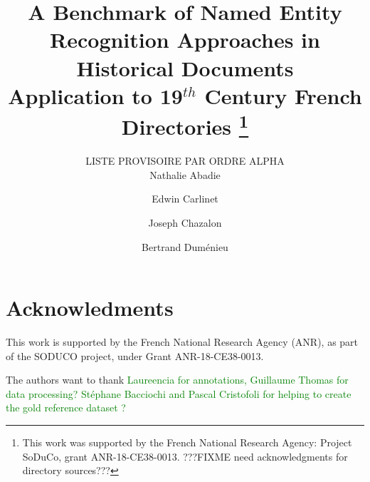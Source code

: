\documentclass[runningheads,svgnames]{llncs}
\begin{document}
%
\title{A Benchmark of Named Entity Recognition Approaches in Historical Documents\\
Application to 19$^{th}$ Century French Directories%
\thanks{This work was supported by the French National Research Agency:
Project SoDuCo, grant ANR-18-CE38-0013. ???FIXME need acknowledgments for directory sources???}}
%
%
\author{LISTE PROVISOIRE PAR ORDRE ALPHA\\
%
Nathalie Abadie \and
Edwin Carlinet \and
Joseph Chazalon \and
Bertrand Duménieu}
%
%
%
\maketitle              %
%
\begin{abstract}

\end{abstract}









\section*{Acknowledments}
This work is supported by the French National Research Agency (ANR), as part of the SODUCO project, under Grant ANR-18-CE38-0013.

The authors want to thank \textcolor{green}{Laureencia for annotations, Guillaume Thomas for data processing? Stéphane Bacciochi and Pascal Cristofoli for helping to create the gold reference dataset ?}



\end{document}
